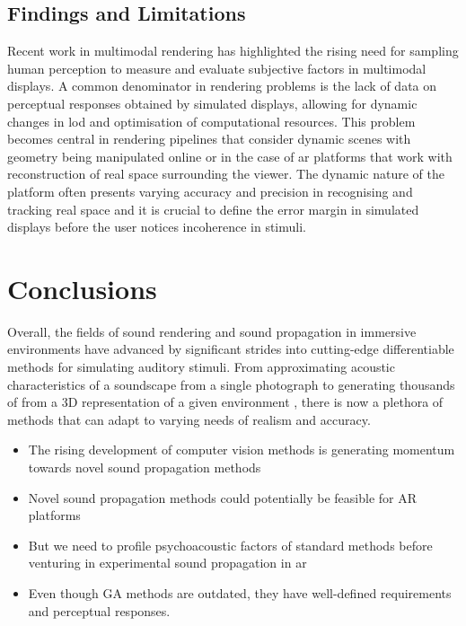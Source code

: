 \subsection{Findings and Limitations}
Recent work in multimodal rendering has highlighted the rising need for sampling human perception to measure and evaluate subjective factors in multimodal displays. A common denominator in rendering problems is the lack of data on perceptual responses obtained by simulated displays, allowing for dynamic changes in \acrshort{lod} and optimisation of computational resources. This problem becomes central in rendering pipelines that consider dynamic scenes with geometry being manipulated online or in the case of \acrshort{ar} platforms that work with reconstruction of real space surrounding the viewer. The dynamic nature of the platform often presents varying accuracy and precision in recognising and tracking real space and it is crucial to define the error margin in simulated displays before the user notices incoherence in stimuli.


\section{Conclusions}
Overall, the fields of sound rendering and sound propagation in immersive environments have advanced by significant strides into cutting-edge differentiable methods for simulating auditory stimuli. From approximating acoustic characteristics of a soundscape from a single photograph \citep{Singh_2021_ICCV} to generating thousands of  from a 3D representation of a given environment \citep{ratnarajah2022mesh2ir}, there is now a plethora of methods that can adapt to varying needs of realism and accuracy.

\begin{itemize}
    \item The rising development of computer vision methods is generating momentum towards novel sound propagation methods
    \item Novel sound propagation methods could potentially be feasible for AR platforms
    \item But we need to profile psychoacoustic factors of standard methods before venturing in experimental sound propagation in ar
    \item Even though GA methods are outdated, they have well-defined requirements and perceptual responses.
 
\end{itemize}

